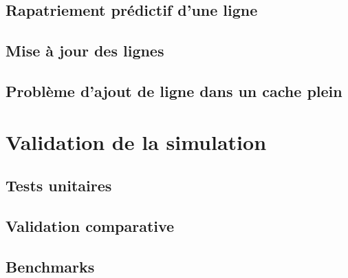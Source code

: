 \subsection{Rapatriement prédictif d'une ligne}

\subsection{Mise à jour des lignes}

\subsection{Problème d'ajout de ligne dans un cache plein}


\section{Validation de la simulation}

\subsection{Tests unitaires}

\subsection{Validation comparative}

\subsection{Benchmarks}

